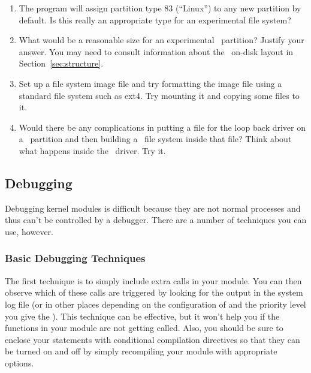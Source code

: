 \begin{enumerate}

\item The  program will assign partition type 83 (``Linux'') to any new partition
  by default. Is this really an appropriate type for an experimental file system?

\item What would be a reasonable size for an experimental \GenericFS\ partition? Justify your
  answer. You may need to consult information about the \GenericFS\ on-disk layout in
  Section~\ref{sec:structure}.

\item Set up a file system image file and try formatting the image file using a standard file
  system such as ext4. Try mounting it and copying some files to it.

\item Would there be any complications in putting a file for the loop back driver on a
  \GenericFS\ partition and then building a \GenericFS\ file system inside that file? Think
  about what happens inside the \GenericFS\ driver. Try it.

\end{enumerate}

\subsection{Debugging \GenericFS}
\label{sec:debugging}

Debugging kernel modules is difficult because they are not normal processes and thus can't be
controlled by a debugger. There are a number of techniques you can use, however.

\subsubsection{Basic Debugging Techniques}

The first technique is to simply include extra  calls in your module. You can then
observe which of these calls are triggered by looking for the output in the system log file (or
in other places depending on the configuration of  and the priority level you
give the ). This technique can be effective, but it won't help you if the functions
in your module are not getting called. Also, you should be sure to enclose your 
statements with conditional compilation directives so that they can be turned on and off by
simply recompiling your module with appropriate options.

